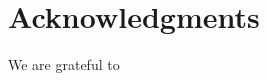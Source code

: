 \documentclass[manuscript]{aastex}
\begin{document}


\acknowledgments
\section{Acknowledgments}
We are grateful to 




\end{document}
